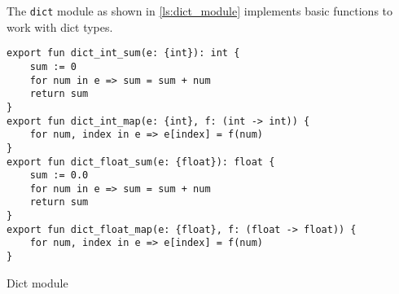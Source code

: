 The \texttt{dict} module as shown in \autoref{ls:dict_module} implements basic functions to work with dict types.

\begin{listing}[H]
\begin{verbatim}
export fun dict_int_sum(e: {int}): int {
    sum := 0
    for num in e => sum = sum + num
    return sum
}
export fun dict_int_map(e: {int}, f: (int -> int)) {
    for num, index in e => e[index] = f(num)
}
export fun dict_float_sum(e: {float}): float {
    sum := 0.0
    for num in e => sum = sum + num
    return sum
}
export fun dict_float_map(e: {float}, f: (float -> float)) {
    for num, index in e => e[index] = f(num)
}
\end{verbatim}
\caption{Dict module}
\label{ls:dict_module}
\end{listing}
